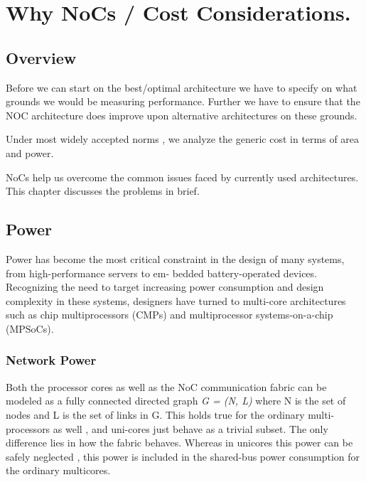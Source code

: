 
\lhead[\chaptername~\thechapter]{\rightmark}


\rhead[\leftmark]{}


\lfoot[\thepage]{}


\cfoot{}


\rfoot[]{\thepage}


\chapter{Why NoCs / Cost Considerations.}


\section{Overview}

Before we can start on the best/optimal architecture we have to specify
on what grounds we would be measuring performance. Further we have
to ensure that the NOC architecture does improve upon alternative
architectures on these grounds.

Under most widely accepted norms , we analyze the generic cost in
terms of area and power. 

NoCs help us overcome the common issues faced by currently used architectures.
This chapter discusses the problems in brief.


\section{Power}

Power has become the most critical constraint in the design of many
systems, from high-performance servers to em- bedded battery-operated
devices. Recognizing the need to target increasing power consumption
and design complexity in these systems, designers have turned to multi-core
architectures such as chip multiprocessors (CMPs) and multiprocessor
systems-on-a-chip (MPSoCs).


\subsection{Network Power}

Both the processor cores as well as the NoC communication fabric can
be modeled as a fully connected directed graph \textit{\small G =
(N, L)} where N is the set of nodes and L is the set of links in G.
This holds true for the ordinary multi-processors as well , and uni-cores
just behave as a trivial subset. The only difference lies in how the
fabric behaves. Whereas in unicores this power can be safely neglected
, this power is included in the shared-bus power consumption for the
ordinary multicores.

